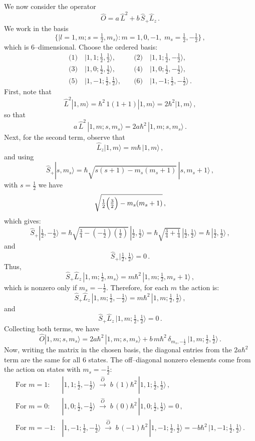 \documentclass{article}
\begin{document}
We now consider the operator
\[
\hat{O} = a\,\hat{L}^2 + b\,\hat{S}_+\hat{L}_z\,.
\]
We work in the basis
\[
\bigl\{|l=1,m; s=\tfrac{1}{2},m_s\rangle : m = 1,0,-1,\; m_s = \tfrac{1}{2}, -\tfrac{1}{2}\bigr\}\,,
\]
which is 6–dimensional. Choose the ordered basis:
\[
\begin{array}{ll}
\text{(1)}\quad |1,1;\tfrac{1}{2},\tfrac{1}{2}\rangle,\quad & \text{(2)}\quad |1,1;\tfrac{1}{2},-\tfrac{1}{2}\rangle,\\[1mm]
\text{(3)}\quad |1,0;\tfrac{1}{2},\tfrac{1}{2}\rangle,\quad & \text{(4)}\quad |1,0;\tfrac{1}{2},-\tfrac{1}{2}\rangle,\\[1mm]
\text{(5)}\quad |1,-1;\tfrac{1}{2},\tfrac{1}{2}\rangle,\quad & \text{(6)}\quad |1,-1;\tfrac{1}{2},-\tfrac{1}{2}\rangle\,.
\end{array}
\]
First, note that
\[
\hat{L}^2|1,m\rangle = \hbar^2\,1(1+1)|1,m\rangle = 2\hbar^2|1,m\rangle\,,
\]
so that
\[
a\,\hat{L}^2\,|1,m;s,m_s\rangle = 2a\hbar^2\,|1,m;s,m_s\rangle\,.
\]
Next, for the second term, observe that
\[
\hat{L}_z|1,m\rangle = m\hbar\,|1,m\rangle\,,
\]
and using
\[
\hat{S}_+|s,m_s\rangle = \hbar\sqrt{s(s+1)-m_s(m_s+1)}\,|s,m_s+1\rangle\,,
\]
with \(s=\tfrac{1}{2}\) we have
\[
\sqrt{\tfrac{1}{2}\Bigl(\tfrac{3}{2}\Bigr)-m_s(m_s+1)}\,,
\]
which gives:
\[
\hat{S}_+|\tfrac{1}{2},-\tfrac{1}{2}\rangle = \hbar\sqrt{\tfrac{3}{4}-\left(-\tfrac{1}{2}\right)\left(\tfrac{1}{2}\right)}\,|\tfrac{1}{2},\tfrac{1}{2}\rangle = \hbar\sqrt{\tfrac{3}{4}+\tfrac{1}{4}}\,|\tfrac{1}{2},\tfrac{1}{2}\rangle = \hbar\,|\tfrac{1}{2},\tfrac{1}{2}\rangle\,,
\]
and
\[
\hat{S}_+|\tfrac{1}{2},\tfrac{1}{2}\rangle = 0\,.
\]
Thus,
\[
\hat{S}_+\hat{L}_z\,|1,m;\tfrac{1}{2},m_s\rangle = m\hbar^2\,|1,m;\tfrac{1}{2},m_s+1\rangle\,,
\]
which is nonzero only if \(m_s=-\tfrac{1}{2}\). Therefore, for each \(m\) the action is:
\[
\hat{S}_+\hat{L}_z\,|1,m;\tfrac{1}{2},-\tfrac{1}{2}\rangle = m\hbar^2\,|1,m;\tfrac{1}{2},\tfrac{1}{2}\rangle\,,
\]
and
\[
\hat{S}_+\hat{L}_z\,|1,m;\tfrac{1}{2},\tfrac{1}{2}\rangle = 0\,.
\]
Collecting both terms, we have
\[
\hat{O}|1,m;s,m_s\rangle = 2a\hbar^2\,|1,m;s,m_s\rangle + b\,m\hbar^2\,\delta_{m_s,-\tfrac{1}{2}}\,|1,m;\tfrac{1}{2},\tfrac{1}{2}\rangle\,.
\]
Now, writing the matrix in the chosen basis, the diagonal entries from the \(2a\hbar^2\) term are the same for all 6 states. The off–diagonal nonzero elements come from the action on states with \(m_s=-\tfrac{1}{2}\):
\[
\begin{array}{rl}
\text{For } m=1: & |1,1;\tfrac{1}{2},-\tfrac{1}{2}\rangle \;\stackrel{\hat{O}}{\longrightarrow}\; b\,(1)\hbar^2\,|1,1;\tfrac{1}{2},\tfrac{1}{2}\rangle\,,\\[1mm]
\text{For } m=0: & |1,0;\tfrac{1}{2},-\tfrac{1}{2}\rangle \;\stackrel{\hat{O}}{\longrightarrow}\; b\,(0)\hbar^2\,|1,0;\tfrac{1}{2},\tfrac{1}{2}\rangle = 0\,,\\[1mm]
\text{For } m=-1: & |1,-1;\tfrac{1}{2},-\tfrac{1}{2}\rangle \;\stackrel{\hat{O}}{\longrightarrow}\; b\,(-1)\hbar^2\,|1,-1;\tfrac{1}{2},\tfrac{1}{2}\rangle = -b\hbar^2\,|1,-1;\tfrac{1}{2},\tfrac{1}{2}\rangle\,.
\end{array}
\]
\end{document}
